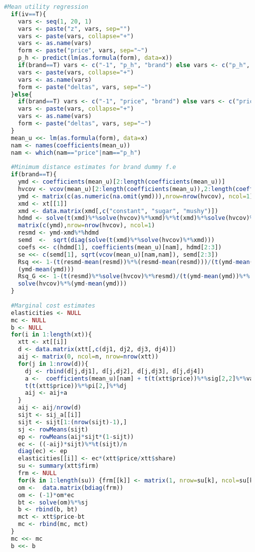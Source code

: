\documentclass[12pt,english]{article}
\begin{document}
\begin{scriptsize}
\begin{lstlisting}[language=R]
  #Mean utility regression
  if(iv==T){
    vars <- seq(1, 20, 1)
    vars <- paste("z", vars, sep="")  
    vars <- paste(vars, collapse="+")
    vars <- as.name(vars)
    form <- paste("price", vars, sep="~")
    p_h <- predict(lm(as.formula(form), data=x))    
    if(brand==T) vars <- c("-1", "p_h", "brand") else vars <- c("p_h", "sugar", "mushy")
    vars <- paste(vars, collapse="+")
    vars <- as.name(vars)
    form <- paste("deltas", vars, sep="~")
  }else{
    if(brand==T) vars <- c("-1", "price", "brand") else vars <- c("price", "sugar", "mushy")
    vars <- paste(vars, collapse="+")
    vars <- as.name(vars)
    form <- paste("deltas", vars, sep="~")
  }
  mean_u <<- lm(as.formula(form), data=x)
  nam <- names(coefficients(mean_u))
  nam <- which(nam=="price"|nam=="p_h")
  
  #Minimum distance estimates for brand dummy f.e
  if(brand==T){
    ymd <- coefficients(mean_u)[2:length(coefficients(mean_u))]
    hvcov <- vcov(mean_u)[2:length(coefficients(mean_u)),2:length(coefficients(mean_u))]
    ymd <- matrix(c(as.numeric(na.omit(ymd))),nrow=nrow(hvcov), ncol=1) 
    xmd <- xt[[1]]
    xmd <- data.matrix(xmd[,c("constant", "sugar", "mushy")])
    hdmd <- solve(t(xmd)%*%solve(hvcov)%*%xmd)%*%t(xmd)%*%solve(hvcov)%*%
    matrix(c(ymd),nrow=nrow(hvcov), ncol=1)
    resmd <- ymd-xmd%*%hdmd
    semd  <-  sqrt(diag(solve(t(xmd)%*%solve(hvcov)%*%xmd)))
    coefs <<- c(hdmd[1], coefficients(mean_u)[nam], hdmd[2:3])
    se <<- c(semd[1], sqrt(vcov(mean_u)[nam,nam]), semd[2:3]) 
    Rsq <<- 1-(t(resmd-mean(resmd))%*%(resmd-mean(resmd)))/(t(ymd-mean(ymd))%*%
    (ymd-mean(ymd)))
    Rsq_G <<- 1-(t(resmd)%*%solve(hvcov)%*%resmd)/(t(ymd-mean(ymd))%*%
    solve(hvcov)%*%(ymd-mean(ymd)))
  }
  
  #Marginal cost estimates
  elasticities <- NULL
  mc <- NULL
  b <- NULL
  for(i in 1:length(xt)){
    xtt <- xt[[i]]
    d <- data.matrix(xtt[,c(dj1, dj2, dj3, dj4)])   
    aij <- matrix(0, ncol=n, nrow=nrow(xtt))
    for(j in 1:nrow(d)){
      dj <- rbind(d[j,dj1], d[j,dj2], d[j,dj3], d[j,dj4])     
      a <-  coefficients(mean_u)[nam] + t(t(xtt$price))%*%sig[2,2]%*%va[i,] + 
      t(t(xtt$price))%*%pi[2,]%*%dj
      aij <- aij+a
    }
    aij <- aij/nrow(d)
    sijt <- sij_a[[i]]
    sijt <- sijt[1:(nrow(sijt)-1),]
    sj <- rowMeans(sijt)
    ep <- rowMeans(aij*sijt*(1-sijt))
    ec <- ((-aij)*sijt)%*%t(sijt)/n
    diag(ec) <- ep
    elasticities[[i]] <- ec*(xtt$price/xtt$share) 
    su <- summary(xtt$firm)
    frm <- NULL
    for(k in 1:length(su)) {frm[[k]] <- matrix(1, nrow=su[k], ncol=su[k])}   
    om <-  data.matrix(bdiag(frm))
    om <- (-1)*om*ec
    bt <- solve(om)%*%sj
    b <- rbind(b, bt)
    mct <- xtt$price-bt
    mc <- rbind(mc, mct)
  }
  mc <<- mc 
  b <<- b 
  

\end{lstlisting}
\end{scriptsize}
\end{document}
